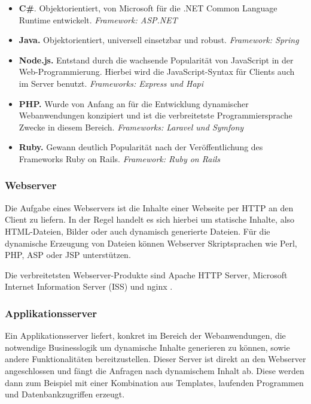 \begin{itemize}
	\item \textbf{C\#}. Objektorientiert, von Microsoft für die .NET Common Language Runtime entwickelt. \textit{Framework: ASP.NET}
	\item \textbf{Java.} Objektorientiert, universell einsetzbar und robust. \textit{Framework: Spring}
	\item \textbf{Node.js.} Entstand durch die wachsende Popularität von JavaScript in der Web-Programmierung. Hierbei wird die JavaScript-Syntax für Clients auch im Server benutzt. \textit{Frameworks: Express und Hapi}
	\item \textbf{PHP.} Wurde von Anfang an für die Entwicklung dynamischer Webanwendungen konzipiert und ist die verbreitetste Programmiersprache Zwecke in diesem Bereich. \textit{Frameworks: Laravel und Symfony}
	\item \textbf{Ruby.} Gewann deutlich Popularität nach der Veröffentlichung des Frameworks Ruby on Rails. \textit{Framework: Ruby on Rails}
\end{itemize}

\subsubsection{Webserver}
Die Aufgabe eines Webservers ist die Inhalte einer Webseite per \acs{HTTP} an den Client zu liefern. In der Regel handelt es sich hierbei um statische Inhalte, also \acs{HTML}-Dateien, Bilder oder auch dynamisch generierte Dateien. Für die dynamische Erzeugung von Dateien können Webserver Skriptsprachen wie Perl, PHP, ASP oder JSP unterstützen.

Die verbreitetsten Webserver-Produkte sind Apache \acs{HTTP} Server, Microsoft Internet Information Server (\acs{ISS}) und nginx \cite{Rouse2012}. %

\subsubsection{Applikationsserver}
Ein Applikationsserver liefert, konkret im Bereich der Webanwendungen, die notwendige Businesslogik um dynamische Inhalte generieren zu können, sowie andere Funktionalitäten bereitzustellen. Dieser Server ist direkt an den Webserver angeschlossen und fängt die Anfragen nach dynamischem Inhalt ab. Diese werden dann zum Beispiel mit einer Kombination aus Templates, laufenden Programmen und Datenbankzugriffen erzeugt. \cite{ITWissen.info2013}

